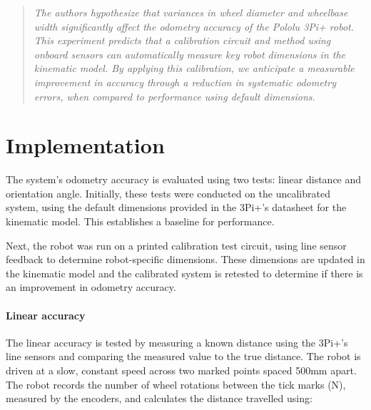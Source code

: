 \documentclass[conference]{IEEEtran}
\begin{document}
\begin{quote}
    \emph{
    The authors hypothesize that variances in wheel diameter and wheelbase width significantly affect the odometry accuracy of the Pololu 3Pi+ robot.
    This experiment predicts that a calibration circuit and method using onboard sensors can automatically measure key robot dimensions in the kinematic model.
    By applying this calibration, we anticipate a measurable improvement in accuracy through a reduction in systematic odometry errors, when compared to performance using default dimensions.
    }
\end{quote}





\section{Implementation}\label{sec:implementation}

The system's odometry accuracy is evaluated using two tests: linear distance and orientation angle. 
Initially, these tests were conducted on the uncalibrated system, using the default dimensions provided in the 3Pi+’s datasheet for the kinematic model. This establishes a baseline for performance.

Next, the robot was run on a printed calibration test circuit, using line sensor feedback to determine robot-specific dimensions. 
These dimensions are updated in the kinematic model and the calibrated system is retested to determine if there is an improvement in odometry accuracy.

\paragraph{Linear accuracy} The linear accuracy is tested by measuring a known distance using the 3Pi+'s line sensors and comparing the measured value to the true distance.
The robot is driven at a slow, constant speed across two marked points spaced 500mm apart.
The robot records the number of wheel rotations between the tick marks (N), measured by the encoders, and calculates the distance travelled using:
\end{document}
